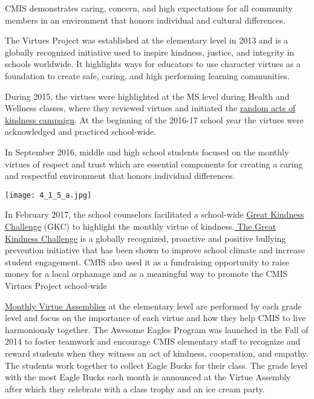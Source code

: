 \begin{findings}
CMIS demonstrates caring, concern, and high expectations for all community members in an environment that honors individual and cultural differences.

The Virtues Project was established at the elementary level in 2013 and is a globally recognized initiative used to inspire kindness, justice, and integrity in schools worldwide. It highlights ways for educators to use character virtues as a foundation to create safe, caring, and high performing learning communities. 

During 2015, the virtues were highlighted at the MS level during Health and Wellness classes, where they reviewed virtues and initiated the \href{https://docs.google.com/forms/d/e/1FAIpQLScP9Fpphz10qaY0S4RO3VLKBQ54RC3WQdP-FGIBbPOcXzMwpQ/viewform?c=0&w=1}{random acts of kindness campaign}. At the beginning of the 2016-17 school year the virtues were acknowledged and practiced school-wide.


In September 2016, middle and high school students focused on the monthly virtues of respect  and trust  which are essential  components for creating a caring and respectful environment that honors individual differences.

{\centering\texttt{[image: 4\_1\_5\_a.jpg]}}

In February 2017, the school counselors facilitated a school-wide \href{https://docs.google.com/a/cmis.ac.th/document/d/1PsHRple71FshloSGrqvYHgQQCYx9_CwCsbtlMAkb-Aw/edit?usp=sharing}{Great Kindness Challenge} (GKC) to highlight the monthly virtue of kindness.\href{https://dochub.com/roneldanelcapadona/gDPKV2/gkc?dt=ysuio255qfhtbryf}{ The Great Kindness Challenge} is a globally recognized, proactive and positive bullying prevention initiative that has been shown to improve school climate and increase student engagement. CMIS also used it as a fundraising opportunity to raise money for a local orphanage and as a meaningful way to promote the CMIS Virtues Project school-wide

\href{https://docs.google.com/a/cmis.ac.th/document/d/1Mv1xjTpbY36naur8SDt9GanKNfR7YtYVL-bWwGLPSHo/edit?usp=sharing}{Monthly Virtue Assemblies} at the elementary level are performed by each grade level and focus on the importance of each virtue and how they help CMIS to live harmoniously together. The Awesome Eagles Program was launched in the Fall of 2014 to foster teamwork and encourage CMIS elementary staff to recognize and reward students when they witness an act of kindness, cooperation, and empathy. The students work together to collect Eagle Bucks for their class. The grade level with the most Eagle  Bucks each month is announced at the Virtue Assembly after which they celebrate with a class trophy and an ice cream party.


\end{findings}
